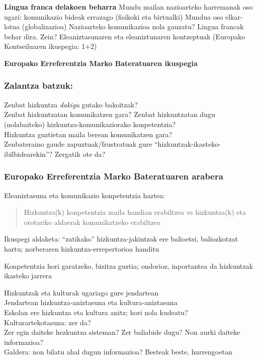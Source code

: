 \documentclass[
]{book}
\begin{document}
\textbf{Lingua franca delakoen beharra}
Mundu mailan nazioarteko harremanak oso ugari: komunikazio bideak errazago (fisikoki eta birtualki)
Mundua oso elkar-lotua (globalizazioa)
Nazioarteko komunikazioa nola gauzatu?
Lingua francak behar dira. Zein?
Eleaniztasunaren eta eleaniztunaren kontzeptuak
(Europako Kontseiluaren ikuspegia: 1+2)

\textbf{Europako Erreferentzia Marko Bateratuaren ikuspegia}

\hypertarget{zalantza-batzuk}{%
\subsubsection{Zalantza batzuk:}\label{zalantza-batzuk}}

Zenbat hizkuntza \emph{dakigu} gutako bakoitzak?\\
Zenbat hizkuntzatan komunikatzen gara? Zenbat hizkuntzatan dugu (nolabaiteko) hizkuntza-komunikaziorako konpetentzia?\\
Hizkuntza guztietan maila berean komunikatzen gara?\\
Zenbateraino gaude zapuztuak/frustratuak gure ``hizkuntzak-ikasteko-ibilbidearekin''? Zergatik ote da?

\hypertarget{europako-erreferentzia-marko-bateratuaren-arabera}{%
\subsubsection{Europako Erreferentzia Marko Bateratuaren arabera}\label{europako-erreferentzia-marko-bateratuaren-arabera}}

Eleaniztasuna eta komunikazio konpetentzia haztea:

\begin{quote}
Hizkuntza(k) konpetentzia maila handian erabiltzea vs hizkuntza(k) eta orotariko aldaerak komunikatzeko erabiltzea
\end{quote}

Ikuspegi aldaketa: ``zatikako'' hizkuntza-jakintzak ere balioetsi, baliozkotzat hartu; norberaren hizkuntza-errepertorioa handitu

Konpetentzia hori garatzeko, bizitza guztia; ondorioz, inportantea da hizkuntzak ikasteko jarrera

Hizkuntzak eta kulturak ugariago gure jendartean\\
Jendartean hizkuntza-aniztasuna eta kultura-aniztasuna\\
Eskolan ere hizkuntza eta kultura anitz; hori nola kudeatu?\\
Kulturartekotasuna: zer da?\\
Zer egin daiteke hezkuntza sisteman? Zer baliabide dugu? Non aurki daiteke informazioa?\\
Galdera: non bilatu ahal dugun informazioa? Besteak beste, hurrengoetan
\end{document}
